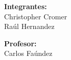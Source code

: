 \documentclass[12pt]{article}
\begin{document}
\hypersetup{pageanchor=false}
\clearpage\maketitle
\thispagestyle{empty}

\begin{flushright}
\textbf{Integrantes:}\\
Christopher Cromer\\
Raúl Hernandez
\end{flushright}

\begin{flushright}
\textbf{Profesor:}\\
Carlos Faúndez
\end{flushright}

\newpage

\clearpage
\thispagestyle{empty}
\tableofcontents

\newpage
\hypersetup{pageanchor=true}






\end{document}
